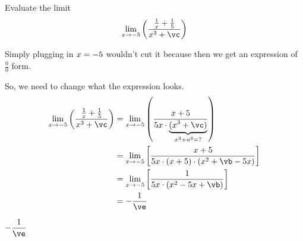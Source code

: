 


\POWER{}\vb
\POWER{}\vc
\SQUARE\vb\vd
\MULTIPLY{}\ve

\question[2] Evaluate the limit 
  \[\lim_{x\to -\va}\left(\dfrac{\frac{1}{x} + \frac{1}{\va}}{x^3+\vc} \right) \]

\watchout

\begin{solution}[\mcq]
  Simply plugging in $x=-5$ wouldn't cut it because then we get an expression of $\frac{0}{0}$ form. 
  
  So, we need to change what the expression looks.
  \begin{align}
    \lim_{x\to -\va}\left( \dfrac{\frac{1}{x} + \frac{1}{\va}}{x^3 + \vc}\right) &=
    \lim_{x\to -\va}\left( \dfrac{x + \va}{\va x\cdot 
    \underbrace{(x^3 + \vc)}_{x^3 + a^3 = ?}}\right) \\
    &= \lim_{x\to -\va}\left[ \dfrac{x + \va}
    {\va x\cdot (x + \va)\cdot (x^2 + \vb -\va x)}\right] \\
    &= \lim_{x\to -\va}\left[ \dfrac{1}{\va x\cdot (x^2-\va x + \vb) }\right] \\
    &= -\dfrac{1}{\ve}
  \end{align}
\end{solution}

\ifprintanswers\begin{codex}$-\dfrac{1}\ve$\end{codex}\fi
